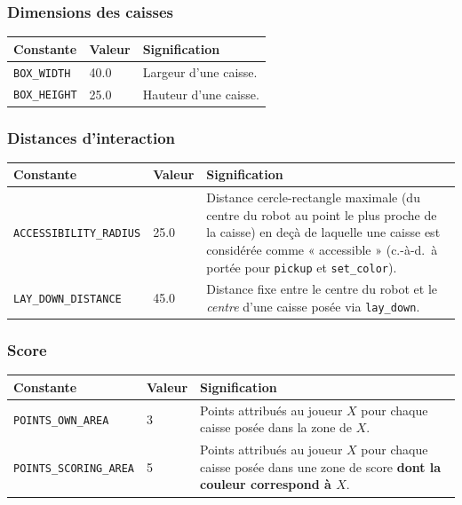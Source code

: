 \documentclass[11pt,a4paper]{article}
\newcommand{\code}[1]{\texttt{#1}}
\newcommand{\func}[1]{\texttt{#1}}
\begin{document}
\subsubsection*{Dimensions des caisses}
\begin{longtable}{p{4.7cm}p{2cm}p{8cm}}
\toprule
\textbf{Constante} & \textbf{Valeur} & \textbf{Signification} \\
\midrule
\endhead
\code{BOX\_WIDTH} & 40.0 & Largeur d'une caisse. \\
\code{BOX\_HEIGHT} & 25.0 & Hauteur d'une caisse. \\
\bottomrule
\end{longtable}

\subsubsection*{Distances d'interaction}
\begin{longtable}{p{4.7cm}p{2cm}p{8cm}}
\toprule
\textbf{Constante} & \textbf{Valeur} & \textbf{Signification} \\
\midrule
\endhead
\code{ACCESSIBILITY\_RADIUS} & 25.0 & Distance cercle-rectangle
    maximale (du centre du robot au point le plus proche de la caisse) en
    deçà de laquelle une caisse est considérée comme « accessible »
    (c.-à-d.\ à portée pour \func{pickup} et \func{set\_color}). \\
\code{LAY\_DOWN\_DISTANCE} & 45.0 & Distance fixe entre le centre du
    robot et le \emph{centre} d'une caisse posée via \func{lay\_down}. \\
\bottomrule
\end{longtable}

\subsubsection*{Score}
\begin{longtable}{p{4.7cm}p{2cm}p{8cm}}
\toprule
\textbf{Constante} & \textbf{Valeur} & \textbf{Signification} \\
\midrule
\endhead
\code{POINTS\_OWN\_AREA} & 3 & Points attribués au joueur $X$ pour
    chaque caisse posée dans la zone de $X$. \\
\code{POINTS\_SCORING\_AREA} & 5 & Points attribués au joueur $X$
    pour chaque caisse posée dans une zone de score \textbf{dont la couleur
    correspond à $X$}. \\
\bottomrule
\end{longtable}
\end{document}
